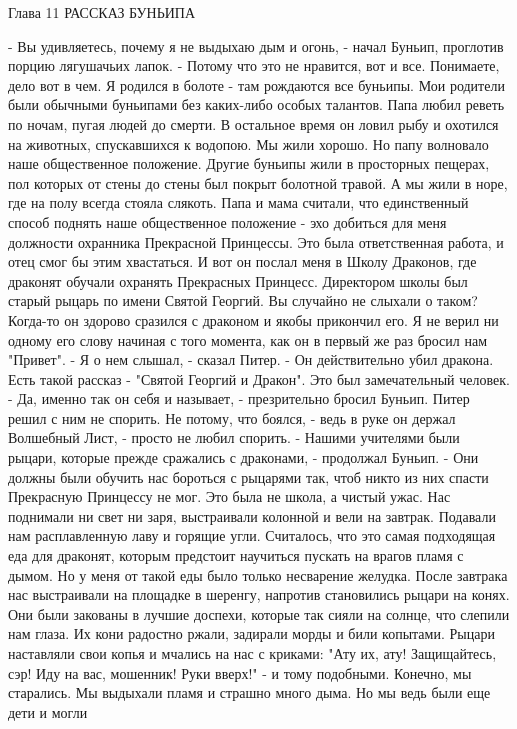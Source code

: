 Глава 11
        РАССКАЗ БУНЬИПА

    - Вы удивляетесь, почему я не выдыхаю дым и огонь, - начал Буньип, 
проглотив порцию лягушачьих лапок. - Потому что это не нравится, вот и 
все.
    Понимаете, дело вот в чем. Я родился в болоте - там рождаются все 
буньипы. Мои родители были обычными буньипами без каких-либо особых 
талантов. Папа любил реветь по ночам, пугая людей до смерти. В 
остальное время он ловил рыбу и охотился на животных, спускавшихся к 
водопою. Мы жили хорошо. Но папу волновало наше общественное 
положение. Другие буньипы жили в просторных пещерах, пол которых от 
стены до стены был покрыт болотной травой. А мы жили в норе, где на 
полу всегда стояла слякоть. Папа и мама считали, что единственный 
способ поднять наше общественное положение - эхо добиться для меня 
должности охранника Прекрасной Принцессы. Это была ответственная 
работа, и отец смог бы этим хвастаться.
    И вот он послал меня в Школу Драконов, где драконят обучали 
охранять Прекрасных Принцесс. Директором школы был старый рыцарь по 
имени Святой Георгий. Вы случайно не слыхали о таком? Когда-то он 
здорово сразился с драконом и якобы прикончил его. Я не верил ни 
одному его слову начиная с того момента, как он в первый же раз бросил 
нам "Привет".
    - Я о нем слышал, - сказал Питер. - Он действительно убил дракона. 
Есть такой рассказ - "Святой Георгий и Дракон". Это был замечательный 
человек.
    - Да, именно так он себя и называет, - презрительно бросил Буньип.
    Питер решил с ним не спорить. Не потому, что боялся, - ведь в руке 
он держал Волшебный Лист, - просто не любил спорить.
    - Нашими учителями были рыцари, которые прежде сражались с 
драконами, - продолжал Буньип. - Они должны были обучить нас бороться 
с рыцарями так, чтоб никто из них спасти Прекрасную Принцессу не мог.
    Это была не школа, а чистый ужас. Нас поднимали ни свет ни заря, 
выстраивали колонной и вели на завтрак. Подавали нам расплавленную 
лаву и горящие угли. Считалось, что это самая подходящая еда для 
драконят, которым предстоит научиться пускать на врагов пламя с дымом. 
Но у меня от такой еды было только несварение желудка.
    После завтрака нас выстраивали на площадке в шеренгу, напротив 
становились рыцари на конях. Они были закованы в лучшие доспехи, 
которые так сияли на солнце, что слепили нам глаза. Их кони радостно 
ржали, задирали морды и били копытами. Рыцари наставляли свои копья и 
мчались на нас с криками: "Ату их, ату! Защищайтесь, сэр! Иду на вас, 
мошенник! Руки вверх!" - и тому подобными. Конечно, мы старались. Мы 
выдыхали пламя и страшно много дыма. Но мы ведь были еще дети и могли 
